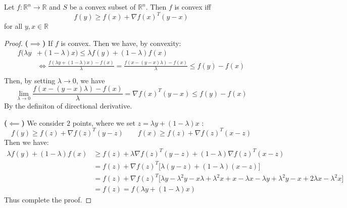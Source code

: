 \begin{theorem}
    \label{thm:cvx-first-order}
    Let $f:\mathbb{R}^n\rightarrow \mathbb{R}$ and $S$ be a convex subset of $\mathbb{R}^n$. Then $f$ is convex iff 
    \begin{equation*}
        f(y) \ge f(x) + \nabla f(x)^T(y-x)
    \end{equation*}
    for all $y, x \in \mathbb{R}$
\end{theorem}
\begin{proof}
    \textbf{($\boldsymbol \implies$)} If $f$ is convex. Then we have, by convexity:
    \begin{equation*}
    \begin{aligned}
        f(\lambda y &+ (1-\lambda)x) \le \lambda f(y) + (1-\lambda)f(x)  \\
        &\iff \frac{f(\lambda y + (1-\lambda)x) - f(x)}{\lambda} = \frac{f(x - (y-x)\lambda) - f(x)}{\lambda} \le  f(y) - f(x)\\
    \end{aligned}
    \end{equation*}
    Then, by setting $\lambda \rightarrow 0$, we have 
    \begin{equation*}
        \lim_{\lambda\rightarrow0} \frac{f(x - (y-x)\lambda) - f(x)}{\lambda} = \nabla f(x)^T(y-x) \le f(y) - f(x)
    \end{equation*}
    By the definiton of directional derivative.

    \textbf{($\boldsymbol \impliedby$)} We consider $2$ points, where we set $z = \lambda y + (1-\lambda)x$ :
    \begin{equation*}
        f(y) \ge f(z) + \nabla f(z)^T(y-z) \qquad f(x) \ge f(z) + \nabla f(z)^T(x-z)
    \end{equation*} 
    Then we have:
    \begin{equation*}
    \begin{aligned}
        \lambda f(y) + (1-\lambda)f(x) &\ge f(z) + \lambda \nabla f(z)^T(y-z) + (1-\lambda) \nabla f(z)^T(x-z)\\ 
        &= f(z) + \nabla f(z)^T\Big[ \lambda(y-z) + (1-\lambda)(x-z) \Big] \\
        &= f(z) + \nabla f(z)^T\Big[ \lambda y - \lambda^2y - x\lambda + \lambda^2 x + x - \lambda x - \lambda y + \lambda^2y - x + 2\lambda x - \lambda^2x \Big] \\
        &= f(z) = f(\lambda y + (1-\lambda)x)
    \end{aligned}
    \end{equation*}
    Thus complete the proof.
\end{proof}

